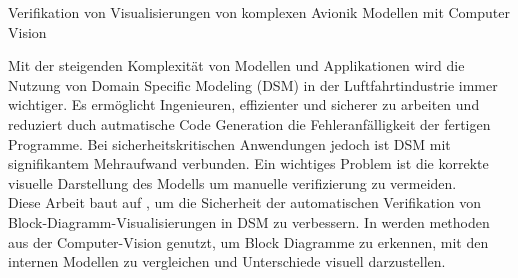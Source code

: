 \label{kurzzusammenfassung}
{\LARGE Verifikation von Visualisierungen von komplexen Avionik Modellen mit Computer Vision}

Mit der steigenden Komplexität von Modellen und Applikationen wird die Nutzung von Domain Specific Modeling (DSM) in der Luftfahrtindustrie immer wichtiger. Es ermöglicht Ingenieuren, effizienter und sicherer zu arbeiten und reduziert duch autmatische Code Generation die Fehleranfälligkeit der fertigen Programme. Bei sicherheitskritischen Anwendungen jedoch ist DSM mit signifikantem Mehraufwand verbunden. Ein wichtiges Problem ist die korrekte visuelle Darstellung des Modells um manuelle verifizierung zu vermeiden.\\
Diese Arbeit baut auf \cite{ar_prof_paper}, um die Sicherheit der automatischen Verifikation von Block-Diagramm-Visualisierungen in DSM zu verbessern. In \cite{ar_prof_paper} werden methoden aus der Computer-Vision genutzt, um Block Diagramme zu erkennen, mit den internen Modellen zu vergleichen und Unterschiede visuell darzustellen. 